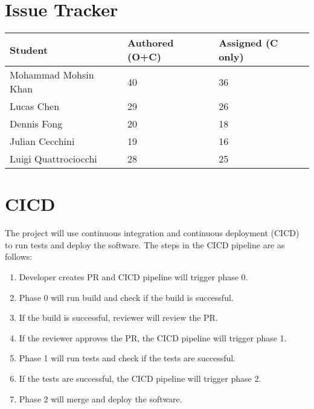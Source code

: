 \documentclass{article}
\begin{document}
\section{Issue Tracker}

\begin{table}[H]
\centering
\begin{tabular}{lll}
\toprule
\textbf{Student} & \textbf{Authored (O+C)} & \textbf{Assigned (C only)}\\
\midrule
Mohammad Mohsin Khan & 40 & 36\\
Lucas Chen & 29 & 26\\
Dennis Fong & 20 & 18\\
Julian Cecchini & 19 & 16\\
Luigi Quattrociocchi & 28 & 25\\
\bottomrule
\end{tabular}
\end{table}

\section{CICD}

The project will use continuous integration and continuous deployment (CICD) to run tests and deploy the software.
The steps in the CICD pipeline are as follows:
\begin{enumerate}
  \item Developer creates PR and CICD pipeline will trigger phase 0.
  \item Phase 0 will run build and check if the build is successful.
  \item If the build is successful, reviewer will review the PR.
  \item If the reviewer approves the PR, the CICD pipeline will trigger phase 1.
  \item Phase 1 will run tests and check if the tests are successful.
  \item If the tests are successful, the CICD pipeline will trigger phase 2.
  \item Phase 2 will merge and deploy the software.
\end{enumerate}



\end{document}
